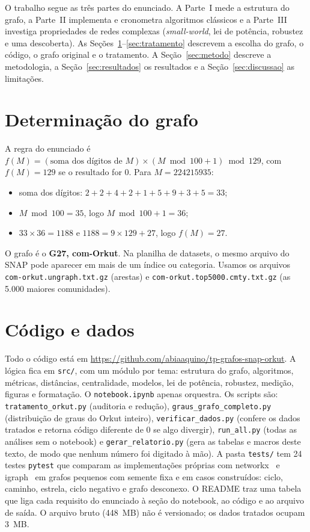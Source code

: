 \IfFileExists{webmedia.cls}{\documentclass[sigconf]{webmedia}}{\documentclass[sigconf]{acmart}}
\newcommand{\matricula}{224215935}
\newcommand{\repo}{\url{https://github.com/abiaaquino/tp-grafos-snap-orkut}}
\begin{document}
O trabalho segue as três partes do enunciado. A Parte~I mede a estrutura do grafo, a Parte~II implementa e cronometra algoritmos clássicos e a Parte~III investiga propriedades de redes complexas (\emph{small-world}, lei de potência, robustez e uma descoberta). As Seções~\ref{sec:grafo}--\ref{sec:tratamento} descrevem a escolha do grafo, o código, o grafo original e o tratamento. A Seção~\ref{sec:metodo} descreve a metodologia, a Seção~\ref{sec:resultados} os resultados e a Seção~\ref{sec:discussao} as limitações.

\section{Determinação do grafo}\label{sec:grafo}
A regra do enunciado é $f(M) = (\text{soma dos dígitos de } M) \times (M \bmod 100 + 1) \bmod 129$, com $f(M) = 129$ se o resultado for 0. Para $M = \matricula$:
\begin{itemize}
\item soma dos dígitos: $2+2+4+2+1+5+9+3+5 = 33$;
\item $M \bmod 100 = 35$, logo $M \bmod 100 + 1 = 36$;
\item $33 \times 36 = 1188$ e $1188 = 9 \times 129 + 27$, logo $f(M) = 27$.
\end{itemize}
O grafo é o \textbf{G27, com-Orkut}. Na planilha de datasets, o mesmo arquivo do SNAP pode aparecer em mais de um índice ou categoria. Usamos os arquivos \texttt{com-orkut.ungraph.txt.gz} (arestas) e \texttt{com-orkut.top5000.cmty.txt.gz} (as 5.000 maiores comunidades).

\section{Código e dados}
Todo o código está em \repo. A lógica fica em \texttt{src/}, com um módulo por tema: estrutura do grafo, algoritmos, métricas, distâncias, centralidade, modelos, lei de potência, robustez, medição, figuras e formatação. O \texttt{notebook.ipynb} apenas orquestra. Os scripts são: \texttt{tratamento\_orkut.py} (auditoria e redução), \texttt{graus\_grafo\_completo.py} (distribuição de graus do Orkut inteiro), \texttt{verificar\_dados.py} (confere os dados tratados e retorna código diferente de 0 se algo divergir), \texttt{run\_all.py} (todas as análises sem o notebook) e \texttt{gerar\_relatorio.py} (gera as tabelas e macros deste texto, de modo que nenhum número foi digitado à mão). A pasta \texttt{tests/} tem 24 testes \texttt{pytest} que comparam as implementações próprias com networkx~\cite{hagberg2008} e igraph~\cite{csardi2006} em grafos pequenos com semente fixa e em casos construídos: ciclo, caminho, estrela, ciclo negativo e grafo desconexo. O README traz uma tabela que liga cada requisito do enunciado à seção do notebook, ao código e ao arquivo de saída. O arquivo bruto (448~MB) não é versionado; os dados tratados ocupam 3~MB.
\end{document}

